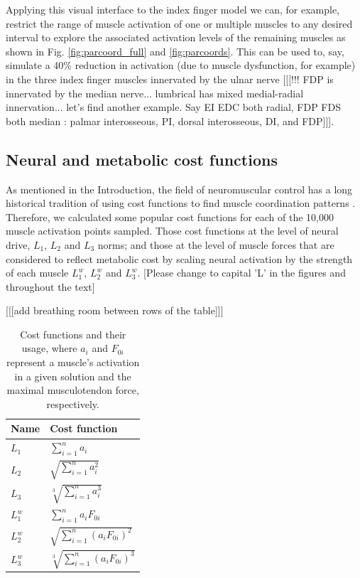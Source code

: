 Applying this visual interface to the index finger model  we can, for example,  restrict the range of muscle activation of one or multiple muscles to any desired interval to explore the associated activation levels of the remaining muscles as shown in Fig. \ref{fig:parcoord_full} and \ref{fig:parcoords}.
This can be used to, say, simulate  a 40\% reduction in activation (due to muscle dysfunction, for example) in the three index finger muscles innervated by the ulnar nerve [[[!!! FDP is  innervated by the median nerve... lumbrical has mixed medial-radial innervation... let's find another example. Say EI EDC both radial, FDP FDS both median : palmar interosseous, PI, dorsal interosseous, DI, and FDP]]]. 

\subsection*{Neural and metabolic  cost functions}

As mentioned in the Introduction, the field of neuromuscular control has a long historical tradition of using cost functions to find muscle coordination patterns \cite{valero-cuevas2015fundamentals,Prilutsky2000Musclecrowninshield1981physiologically}. Therefore, we calculated some  popular cost functions for each of the 10,000 muscle activation points sampled. Those cost functions at the level of neural drive, $L_1$, $L_2$ and $L_3$ norms; and those at the level of muscle forces that are considered to reflect metabolic cost  by scaling neural activation by the strength of each muscle  $L_1^w$, $L_2^w$ and $L_3^w$. [Please change to capital 'L' in the figures and throughout the text]

[[[add breathing room between rows of the table]]]
\begin{table}[h]
\centering
\begin{tabular}{@{}ll@{}}
\toprule
\textbf{Name} & \textbf{Cost function}  \\ \midrule
$L_1$            & $\sum_{i=1}^n a_i$                                     \\
$L_2$            & $\sqrt{\sum_{i=1}^n a_i^2}$                                    \\
$L_3$            & $\sqrt[3]{\sum_{i=1}^n a_i^3}$                                   \\
$L_1^w$            & $\sum_{i=1}^n a_i F_{0i}$                                    \\
$L_2^w$            & $\sqrt{\sum_{i=1}^n (a_i F_{0i})^2}$                                  \\
$L_3^w$            & $\sqrt[3]{\sum_{i=1}^n (a_i F_{0i})^3}$                                    \\ \bottomrule
\end{tabular}
\caption{Cost functions and their usage, where $a_i$ and $F_{0i}$ represent a muscle's activation in a given solution and the maximal musculotendon force, respectively.}
\label{cost_function_tabls}
\end{table}

